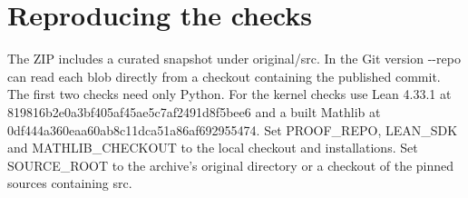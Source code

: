 \documentclass[11pt,letterpaper]{article}
\begin{document}
\section{Reproducing the checks}
The ZIP includes a curated snapshot under {\ttfamily\small original/\allowbreak{}src}. In the Git version {\ttfamily\small -\allowbreak{}-\allowbreak{}repo} can read each blob directly from a checkout containing the published commit. The first two checks need only Python. For the kernel checks use Lean 4.33.1 at {\ttfamily\small 819816b2e0a3bf\allowbreak{}405af45ae5c7af\allowbreak{}2491d8f5bee6} and a built Mathlib at {\ttfamily\small 0df444a360eaa6\allowbreak{}0ab8c11dca51a8\allowbreak{}6af692955474}. Set {\ttfamily\small PROOF\_\allowbreak{}REPO}, {\ttfamily\small LEAN\_\allowbreak{}SDK} and {\ttfamily\small MATHLIB\_\allowbreak{}CHECKOUT} to the local checkout and installations. Set {\ttfamily\small SOURCE\_\allowbreak{}ROOT} to the archive's {\ttfamily\small original} directory or a checkout of the pinned sources containing {\ttfamily\small src}.
\end{document}
